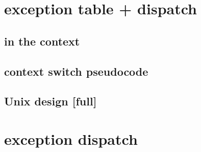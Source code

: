 \section{exception table + dispatch}


\subsection{in the context}


\subsection{context switch pseudocode}


\subsection{Unix design [full]}


\section{exception dispatch}


